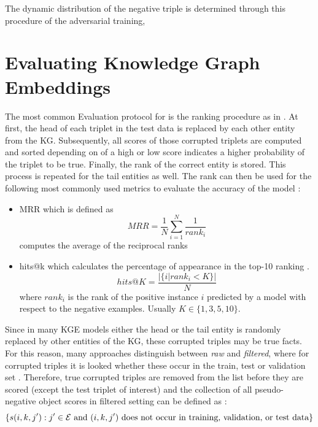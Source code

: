 The dynamic distribution of the negative triple is determined through this procedure of the adversarial training, 

\section{Evaluating Knowledge Graph Embeddings} 
The most common Evaluation protocol for is the ranking procedure as in \cite{TransE}.
At first, the head of each triplet in the test data is replaced by each other entity from the \ac{KG}.
Subsequently, all scores of those corrupted triplets are computed and sorted depending on of a high or low score indicates a higher probability of the triplet to be true.
Finally, the rank of the correct entity is stored.
This process is repeated for the tail entities as well.
The rank can then be used for the following most commonly used metrics to evaluate the accuracy of the model \cite{kotnis2017analysis}:
\begin{itemize}
    \item 
    \ac{MRR} which is defined as
    \begin{equation}
        MRR = \frac{1}{N} \sum_{i=1}^{N}\frac{1}{rank_i}
    \end{equation}
    computes the average of the reciprocal ranks \cite{zhang2021efficient}
    
    \item 
    hits@k which calculates the percentage of appearance in the top-10 ranking \cite{zhang2021efficient}.
    \begin{equation}
        hits@K = \frac{|\{i | rank_i < K\}|}{N}
    \end{equation}
    where $rank_i$ is the rank of the positive instance $i$ predicted by a model with respect to the negative examples.
    Usually $K \in \{1, 3, 5, 10\}$.
\end{itemize}
Since in many \ac{KGE} models either the head or the tail entity is randomly replaced by other entities of the KG, these corrupted triples may be true facts.
For this reason, many approaches distinguish between \textit{raw} and \textit{filtered}, where for corrupted triples it is looked whether these occur in the train, test or validation set \cite{TransE}.
Therefore, true corrupted triples are removed from the list before they are scored (except the test triplet of interest) and the collection of all pseudo-negative object scores in filtered setting can be defined as \cite{Ruffinelli2020You}:
$$
\{s(i,k,j'): j' \in \mathcal{E} \text{ and $(i,k,j')$ does not occur in training, validation, or test data}\}
$$



